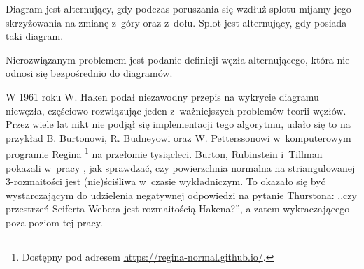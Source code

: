 \begin{definition}
    Diagram jest alternujący,
    gdy podczas poruszania się wzdłuż splotu
    mijamy jego skrzyżowania na zmianę z~góry oraz z~dołu.
    Splot jest alternujący, gdy posiada taki diagram.
\end{definition}

Nierozwiązanym problemem jest podanie definicji węzła alternującego, która nie odnosi się bezpośrednio do diagramów.


W 1961 roku W. Haken \cite{haken61} podał niezawodny przepis na wykrycie diagramu niewęzła,
częściowo rozwiązując jeden z~ważniejszych problemów teorii węzłów.
Przez wiele lat nikt nie podjął się implementacji tego algorytmu,
udało się to na przykład B. Burtonowi, R. Budneyowi oraz W. Petterssonowi w~komputerowym programie Regina
\footnote{Dostępny pod adresem \url{https://regina-normal.github.io/}.} na przełomie tysiącleci.
Burton, Rubinstein i~Tillman pokazali w~pracy \cite{burton12}, jak sprawdzać,
czy powierzchnia normalna na striangulowanej 3-rozmaitości jest (nie)ściśliwa w~czasie wykładniczym.
To okazało się być wystarczającym do udzielenia negatywnej odpowiedzi na pytanie Thurstona:
,,czy przestrzeń Seiferta-Webera jest rozmaitością Hakena?'',
a zatem wykraczającego poza poziom tej pracy.
